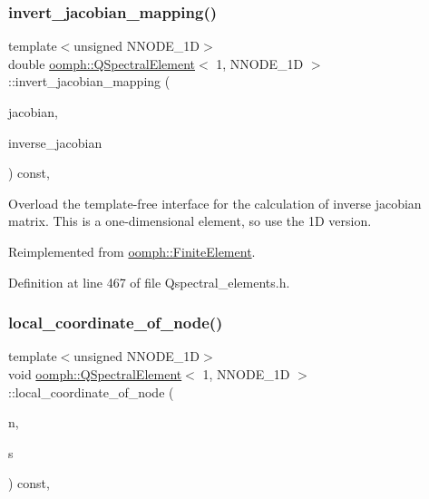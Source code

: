 \subsubsection{\texorpdfstring{invert\+\_\+jacobian\+\_\+mapping()}{invert\_jacobian\_mapping()}}
{\footnotesize\ttfamily template$<$unsigned N\+N\+O\+D\+E\+\_\+1D$>$ \\
double \hyperlink{classoomph_1_1QSpectralElement}{oomph\+::\+Q\+Spectral\+Element}$<$ 1, N\+N\+O\+D\+E\+\_\+1D $>$\+::invert\+\_\+jacobian\+\_\+mapping (\begin{DoxyParamCaption}\item[{const \hyperlink{classoomph_1_1DenseMatrix}{Dense\+Matrix}$<$ double $>$ \&}]{jacobian,  }\item[{\hyperlink{classoomph_1_1DenseMatrix}{Dense\+Matrix}$<$ double $>$ \&}]{inverse\+\_\+jacobian }\end{DoxyParamCaption}) const\hspace{0.3cm}{\ttfamily [inline]}, {\ttfamily [virtual]}}



Overload the template-\/free interface for the calculation of inverse jacobian matrix. This is a one-\/dimensional element, so use the 1D version. 



Reimplemented from \hyperlink{classoomph_1_1FiniteElement_a42c86a7628fee00d3a9d35b935b29e48}{oomph\+::\+Finite\+Element}.



Definition at line 467 of file Qspectral\+\_\+elements.\+h.

\mbox{\label{classoomph_1_1QSpectralElement_3_011_00_01NNODE__1D_01_4_a7ef460d4eecb38fb0fa33b331965265c}} 
\subsubsection{\texorpdfstring{local\+\_\+coordinate\+\_\+of\+\_\+node()}{local\_coordinate\_of\_node()}}
{\footnotesize\ttfamily template$<$unsigned N\+N\+O\+D\+E\+\_\+1D$>$ \\
void \hyperlink{classoomph_1_1QSpectralElement}{oomph\+::\+Q\+Spectral\+Element}$<$ 1, N\+N\+O\+D\+E\+\_\+1D $>$\+::local\+\_\+coordinate\+\_\+of\+\_\+node (\begin{DoxyParamCaption}\item[{const unsigned \&}]{n,  }\item[{\hyperlink{classoomph_1_1Vector}{Vector}$<$ double $>$ \&}]{s }\end{DoxyParamCaption}) const\hspace{0.3cm}{\ttfamily [inline]}, {\ttfamily [virtual]}}



